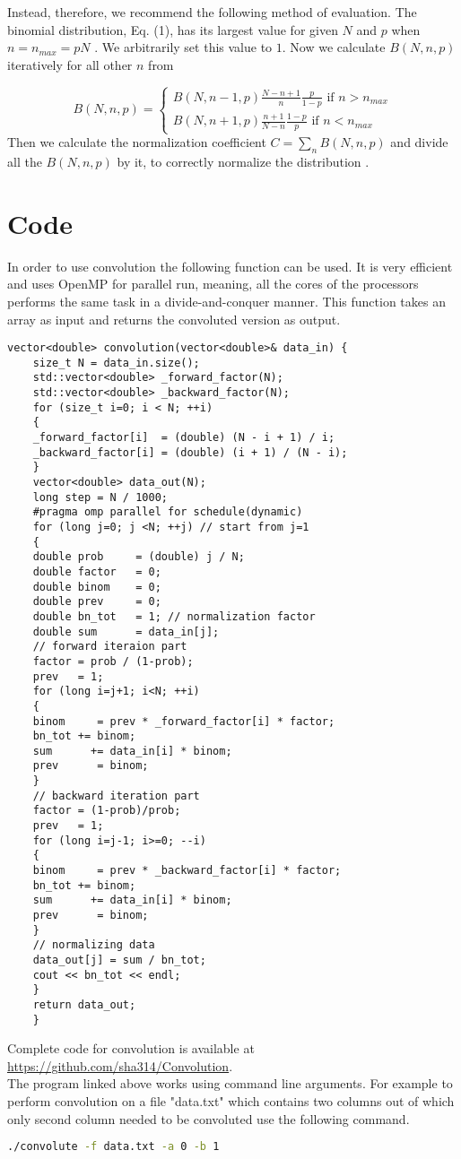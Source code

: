 	Instead, therefore, we recommend the following method of evaluation. The binomial distribution, Eq. (1), has its largest value for given $N$ and $p$ when $n = n_{max} = p N$ . We arbitrarily set this value to $1$. Now we calculate $B(N, n, p)$ iteratively for all other $n$ from
	
	\begin{equation*}
	B(N,n,p) = 
	\begin{cases}
		B(N, n-1, p) \frac{N-n+1}{n} \frac{p}{1-p}  \text{ if } n > n_{max}\\
		B(N, n+1, p) \frac{n+1}{N-n} \frac{1-p}{p}  \text{ if } n < n_{max}
	\end{cases}   
	\end{equation*}
	Then we calculate the normalization coefficient $C = \sum_{n} B(N, n, p)$ and divide all the $B(N, n, p)$ by it, to correctly normalize the distribution 	\cite{Newman2000, Newman2001}.
	
\section{Code}
	In order to use convolution the following function can be used. It is very efficient and uses OpenMP for parallel run, meaning, all the cores of the processors performs the same task in a divide-and-conquer manner. This function takes an array as input and returns the convoluted version as output.
	\begin{lstlisting}[style=CStyle]
	vector<double> convolution(vector<double>& data_in) {
	size_t N = data_in.size();
	std::vector<double> _forward_factor(N);
	std::vector<double> _backward_factor(N);
	for (size_t i=0; i < N; ++i)
	{
	_forward_factor[i]  = (double) (N - i + 1) / i;
	_backward_factor[i] = (double) (i + 1) / (N - i);
	}
	vector<double> data_out(N);
	long step = N / 1000;
	#pragma omp parallel for schedule(dynamic)
	for (long j=0; j <N; ++j) // start from j=1
	{
	double prob     = (double) j / N;
	double factor   = 0;
	double binom    = 0;
	double prev     = 0;
	double bn_tot   = 1; // normalization factor
	double sum      = data_in[j];
	// forward iteraion part
	factor = prob / (1-prob);
	prev   = 1;
	for (long i=j+1; i<N; ++i)
	{
	binom     = prev * _forward_factor[i] * factor;
	bn_tot += binom;
	sum      += data_in[i] * binom;
	prev      = binom;
	}
	// backward iteration part
	factor = (1-prob)/prob;
	prev   = 1;
	for (long i=j-1; i>=0; --i)
	{
	binom     = prev * _backward_factor[i] * factor;
	bn_tot += binom;
	sum      += data_in[i] * binom;
	prev      = binom;
	}
	// normalizing data
	data_out[j] = sum / bn_tot;
	cout << bn_tot << endl;
	}
	return data_out;
	}
	\end{lstlisting}
Complete code for convolution is available at 
\url{https://github.com/sha314/Convolution}.\\

The program linked above works using command line arguments. For example to perform convolution on a file "data.txt" which contains two columns out of which only second column needed to be convoluted use the following command.


\begin{lstlisting}[language=bash]
./convolute -f data.txt -a 0 -b 1
\end{lstlisting}
